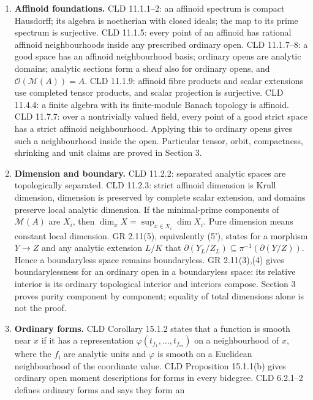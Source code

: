 \documentclass[11pt]{article}
\begin{document}
\begin{enumerate}
\def\labelenumi{\arabic{enumi}.}
\item
  \textbf{Affinoid foundations.} CLD 11.1.1--2: an affinoid spectrum is
  compact Hausdorff; its algebra is noetherian with closed ideals; the
  map to its prime spectrum is surjective. CLD 11.1.5: every point of an
  affinoid has rational affinoid neighbourhoods inside any prescribed
  ordinary open. CLD 11.1.7--8: a good space has an affinoid
  neighbourhood basis; ordinary opens are analytic domains; analytic
  sections form a sheaf also for ordinary opens, and
  \(\mathcal O(\mathcal M(A))=A\). CLD 11.1.9: affinoid fibre products
  and scalar extensions use completed tensor products, and scalar
  projection is surjective. CLD 11.4.4: a finite algebra with its
  finite-module Banach topology is affinoid. CLD 11.7.7: over a
  nontrivially valued field, every point of a good strict space has a
  strict affinoid neighbourhood. Applying this to ordinary opens gives
  such a neighbourhood inside the open. Particular tensor, orbit,
  compactness, shrinking and unit claims are proved in Section 3.
\item
  \textbf{Dimension and boundary.} CLD 11.2.2: separated analytic spaces
  are topologically separated. CLD 11.2.3: strict affinoid dimension is
  Krull dimension, dimension is preserved by complete scalar extension,
  and domains preserve local analytic dimension. If the minimal-prime
  components of \(\mathcal M(A)\) are \(X_i\), then
  \(\dim_xX=\sup_{x\in X_i}\dim X_i\). Pure dimension means constant
  local dimension. GR 2.11(5), equivalently (5'), states for a morphism
  \(Y\to Z\) and any analytic extension \(L/K\) that
  \(\partial(Y_L/Z_L)\subseteq\pi^{-1}(\partial(Y/Z))\). Hence a
  boundaryless space remains boundaryless. GR 2.11(3),(4) gives
  boundarylessness for an ordinary open in a boundaryless space: its
  relative interior is its ordinary topological interior and interiors
  compose. Section 3 proves purity component by component; equality of
  total dimensions alone is not the proof.
\item
  \textbf{Ordinary forms.} CLD Corollary 15.1.2 states that a function
  is smooth near \(x\) if it has a representation
  \(\varphi(t_{f_1},\ldots,t_{f_m})\) on a neighbourhood of \(x\), where
  the \(f_i\) are analytic units and \(\varphi\) is smooth on a
  Euclidean neighbourhood of the coordinate value. CLD Proposition
  15.1.1(b) gives ordinary open moment descriptions for forms in every
  bidegree. CLD 6.2.1--2 defines ordinary forms and says they form an

\end{enumerate}
\end{document}
